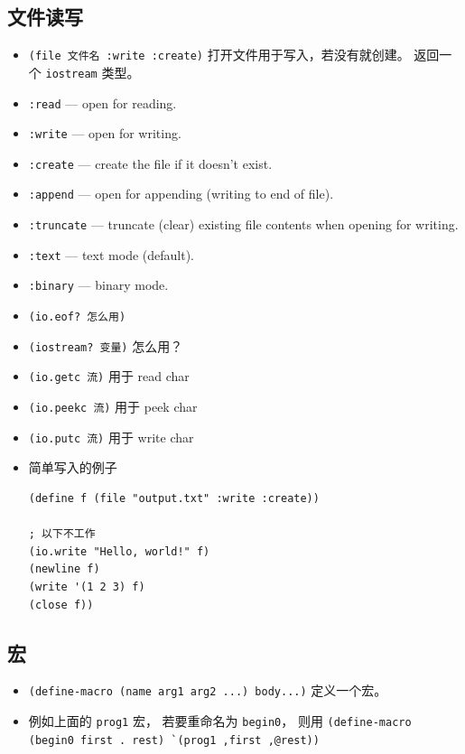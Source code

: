 \subsection{文件读写}
\begin{itemize}
\item \verb`(file 文件名 :write :create)` 打开文件用于写入，若没有就创建。 返回一个 \verb`iostream` 类型。
\item \verb`:read` — open for reading.
\item \verb`:write` — open for writing.
\item \verb`:create` — create the file if it doesn’t exist.
\item \verb`:append` — open for appending (writing to end of file).
\item \verb`:truncate` — truncate (clear) existing file contents when opening for writing.
\item \verb`:text` — text mode (default).
\item \verb`:binary` — binary mode.
\item \verb`(io.eof? 怎么用)`
\item \verb`(iostream? 变量)` 怎么用？
\item \verb`(io.getc 流)` 用于 read char
\item \verb`(io.peekc 流)` 用于 peek char
\item \verb`(io.putc 流)` 用于 write char
\item 简单写入的例子
\begin{lstlisting}[language=none]
(define f (file "output.txt" :write :create))

; 以下不工作
(io.write "Hello, world!" f)
(newline f)
(write '(1 2 3) f)
(close f))
\end{lstlisting}
\end{itemize}


\subsection{宏}
\begin{itemize}
\item \verb`(define-macro (name arg1 arg2 ...) body...)` 定义一个宏。
\item 例如上面的 \verb`prog1` 宏， 若要重命名为 \verb`begin0`， 则用 \verb|(define-macro (begin0 first . rest) `(prog1 ,first ,@rest))|
\end{itemize}

